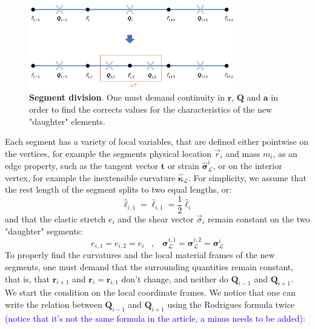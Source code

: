 \documentclass[a4paper, 11pt]{article}
\begin{document}
\\

\begin{figure}[h!]
    \centering
    \includegraphics[width=0.80\textwidth]{seg_div.png}
    \caption{\textbf{Segment division}. One must demand continuity in $\boldsymbol{r}$, $\boldsymbol{Q}$ and $\boldsymbol{a}$ in order to find the corrects values for the characteristics of the new "daughter" elements. } \label{fig:fig1}
\end{figure}
\noindent Each segment has a variety of local variables, that are defined either pointwise on the vertices, for example the segments physical location $\vec{r}_i$ and mass $m_i$, as an edge property, such as the tangent vector $\boldsymbol{t}$ or strain $\hat{\boldsymbol{\sigma}}^i_{\mathcal{L}}$, or on the interior vertex, for example the inextensible curvature $\hat{\boldsymbol{\kappa}}_\mathcal{L}$. 
\noindent For simplicity, we assume that the rest length of the segment splits to two equal lengths, or:
\begin{equation}
\hat{\ell}_{i,1}=\hat{\ell}_{i,1}=\frac{1}{2}\hat{\ell}_i    
\end{equation}
and that the elastic stretch $e_i$ and the shear vector $\vec{\sigma}_i$ remain constant on the two "daughter" segments:
\begin{equation}
    e_{i,1}=e_{i,2}=e_{i}\;\;\;,\;\;\; \boldsymbol{\sigma}^{i,1}_\mathcal{L}=\boldsymbol{\sigma}^{i,2}_\mathcal{L}=\boldsymbol{\sigma}^i_\mathcal{L}
\end{equation}
To properly find the curvatures and the local material frames of the new segments, one must demand that the surrounding quantities remain constant, that is, that $\boldsymbol{r}_{i+1}$ and $\boldsymbol{r}_{i}=\boldsymbol{r}_{i,1}$ don't change, and neither do $\boldsymbol{Q}_{i-1}$ and $\boldsymbol{Q}_{i+1}$.\\
We start the condition on the local coordinate frames. We notice that one can write the relation between $\boldsymbol{Q}_{i-1}$ and $\boldsymbol{Q}_{i+1}$ using the Rodrigues formula twice \textcolor{blue}{(notice that it's not the same formula in the article, a minus needs to be added)}:
\end{document}
